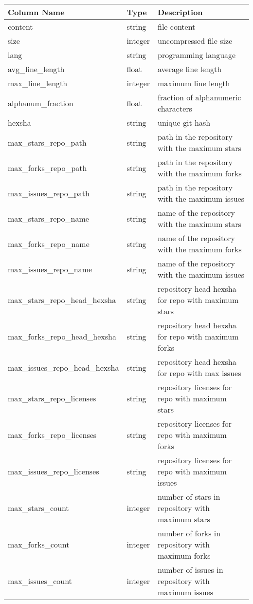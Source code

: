 \documentclass{article}
\begin{document}
	\begin{table}[htbp]
		\centering 
		\begin{tabularx}
			{\textwidth}{|l|l|X|} 
			\hline \textbf{Column Name} & \textbf{Type} & \textbf{Description} \\
			\hline content & string & file content \\ \hline size & integer &
			uncompressed file size\\ \hline lang & string & programming language\\
			\hline avg\_line\_length & float & average line length\\ \hline max\_line\_length
			& integer & maximum line length\\ \hline alphanum\_fraction & float &
			fraction of alphanumeric characters\\ \hline hexsha & string & unique git hash\\
			\hline max\_stars\_repo\_path & string & path in the repository with the
			maximum stars\\ \hline max\_forks\_repo\_path & string & path in the repository
			with the maximum forks\\ \hline max\_issues\_repo\_path & string & path in
			the repository with the maximum issues\\ \hline max\_stars\_repo\_name & string
			& name of the repository with the maximum stars\\ \hline max\_forks\_repo\_name
			& string & name of the repository with the maximum forks\\ \hline max\_issues\_repo\_name
			& string & name of the repository with the maximum issues\\ \hline max\_stars\_repo\_head\_hexsha
			& string & repository head hexsha for repo with maximum stars\\ \hline max\_forks\_repo\_head\_hexsha
			& string & repository head hexsha for repo with maximum forks\\ \hline max\_issues\_repo\_head\_hexsha
			& string & repository head hexsha for repo with max issues\\ \hline max\_stars\_repo\_licenses
			& string & repository licenses for repo with maximum stars\\ \hline max\_forks\_repo\_licenses
			& string & repository licenses for repo with maximum forks\\ \hline max\_issues\_repo\_licenses
			& string & repository licenses for repo with maximum issues\\ \hline max\_stars\_count
			& integer & number of stars in repository with maximum stars\\ \hline max\_forks\_count
			& integer & number of forks in repository with maximum forks\\ \hline max\_issues\_count
			& integer & number of issues in repository with maximum issues\\ \hline
		\end{tabularx}
	\end{table}
\end{document}
